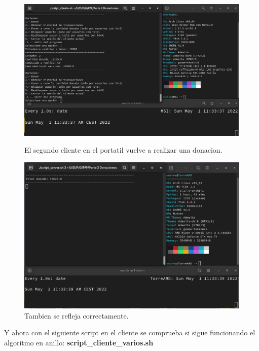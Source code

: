 \documentclass{article}
\begin{document}
\begin{figure}[H]
    \centering
    \begin{minipage}[H]{0.45\textwidth}
        \centering
        \includegraphics[width=\textwidth]{imagenes/multiples ordenadores/Cliente/Screenshot from 2022-05-01 11-33-44.png}
        \caption{El segundo cliente en el portatil vuelve a realizar una donacion.}
    \end{minipage}
    \hfill
    \begin{minipage}[H]{0.45\textwidth}
        \centering
        \includegraphics[width=\textwidth]{imagenes/multiples ordenadores/Servidor/Screenshot from 2022-05-01 11-33-44.png}
        \caption{Tambien se refleja correctamente.}
    \end{minipage}
\end{figure}

Y ahora con el siguiente script en el cliente se comprueba si sigue funcionando el algoritmo en anillo: \textbf{script\_cliente\_varios.sh}
\end{document}
